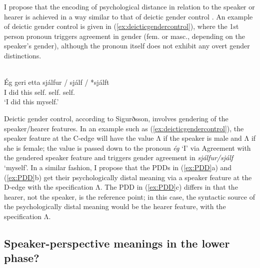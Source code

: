 \documentclass[output=paper]{langsci/langscibook}
\begin{document}
I propose that the encoding of psychological distance in relation to the
speaker or hearer is achieved in a way similar to that of deictic gender
control  \citep[185--186]{sigurdsson2014context}. An example of deictic gender
control is given in (\ref{ex:deicticgendercontrol}), where the  1st
person pronoun triggers agreement in gender (fem. or masc., depending on the
speaker's gender), although the pronoun itself does not exhibit any
overt gender distinctions.

\ea\label{ex:deicticgendercontrol} 
\citep[185]{sigurdsson2014context}\\
	\gll Ég ger\dh{}i \th{}etta sjálfur / sjálf / *sjálft\\
    I did this self.\M{} {} self.\glossF{} {} \hphantom{*}self.\glossN{}\\
	\glt `I did this myself.'
	\z

\noindent Deictic gender control, according to Sigurðsson, involves gendering
of the speak\-er/hear\-er features. In an example such as
(\ref{ex:deicticgendercontrol}), the speaker feature at the C-edge will have
the value  Λ if the speaker is male and Λ if she is female;
the value is passed down to the pronoun \emph{ég} \enquote*{I} via Agreement
with the gendered speaker feature and triggers gender agreement in
\emph{sjálfur/sjálf} \enquote*{myself}.  In a similar fashion, I propose that
the PDDs in (\ref{ex:PDD}a) and (\ref{ex:PDD}b) get their
psychologically distal meaning via a speaker feature at the D-edge with the
specification Λ. The \gls{PDD} in (\ref{ex:PDD}c) differs in
that the hearer, not the speaker, is the reference point; in this case, the
syntactic source of the psychologically distal meaning would be the hearer
feature, with the specification Λ.

\subsection{Speaker-perspective meanings in the lower phase?}
\end{document}
